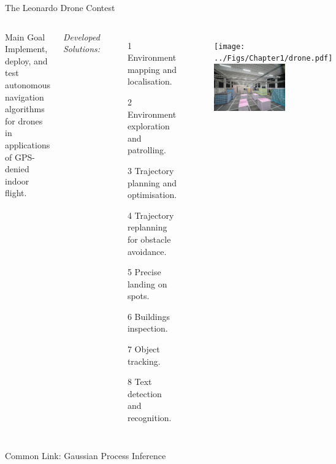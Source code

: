 \documentclass[10pt,aspectratio=169]{beamer}
\begin{document}
\begin{frame}[t]{The Leonardo Drone Contest}  
	\begin{columns}[t]
		\begin{exampleblock}{Main Goal}
			Implement, deploy, and test autonomous navigation algorithms for drones in applications of GPS-denied indoor flight.
		\end{exampleblock}		

		\vspace{0.2cm}
		\textcolor{emph@O4S}{\textit{Developed Solutions:}} \\
		\begin{itemize}
			\item[1] Environment mapping and localisation.
			\item[2] Environment exploration and patrolling.
			\item[3] Trajectory planning and optimisation.
			\item[4] Trajectory replanning for obstacle avoidance.
			\item[5] Precise landing on spots. 
			\item[6] Buildings inspection.
			\item[7] Object tracking.
			\item[8] Text detection and recognition.
		\end{itemize}

		\begin{figure}[!t]
			\centering
			\texttt{[image: ../Figs/Chapter1/drone.pdf]}
			\includegraphics[width=0.6\textwidth]{../Figs/Chapter1/leonardo_map.jpg}
		\end{figure}
	\end{columns} 
\end{frame}

\begin{frame}[t]{Common Link: Gaussian Process Inference}  
	
\end{frame}
\end{document}
